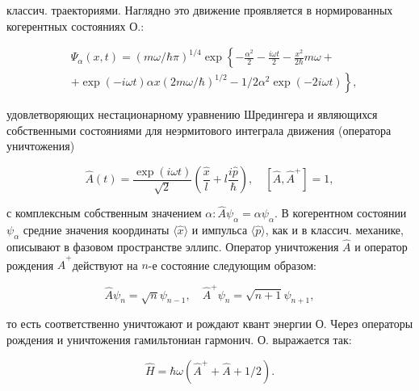 \documentclass[10pt]{article}
\begin{document}
классич. траекториями. Наглядно это движение проявляется в нормированных когерентных состояниях О.:



\[

\begin{aligned}

& \Psi_{\alpha}(x, t)=(m \omega / \hbar \pi)^{1 / 4} \exp \left\{-\frac{\alpha^{2}}{2}-\frac{i \omega t}{2}-\frac{x^{2}}{2 \hbar} m \omega+\right. \\

& \left.+\exp (-i \omega t) \alpha x(2 m \omega / \hbar)^{1 / 2}-1 / 2 \alpha^{2} \exp (-2 i \omega t)\right\},

\end{aligned}

\]



удовлетворяющих нестационарному уравнению Шредингера и являющихся собственными состояниями для неэрмитового интеграла движения (оператора уничтожения)



\[

\hat{A}(t)=\frac{\exp (i \omega t)}{\sqrt{2}}\left(\frac{\hat{x}}{l}+l \frac{i \hat{p}}{\hbar}\right), \quad\left[\hat{A}, \hat{A}^{+}\right]=1,

\]



с комплексным собственным значением $\alpha: \hat{A} \psi_{\alpha}=\alpha \psi_{\alpha}$. В когерентном состоянии $\psi_{\alpha}$ средние значения координаты $\langle\hat{x}\rangle$ и импульса $\langle\hat{p}\rangle$, как и в классич. механике, описывают в фазовом пространстве эллипс. Оператор уничтожения $\hat{A}$ и оператор рождения $\hat{A}^{+}$действуют на $n$-е состояние следующим образом:



\[

\hat{A} \psi_{n}=\sqrt{n} \psi_{n-1}, \quad \hat{A}^{+} \psi_{n}=\sqrt{n+1} \psi_{n+1},

\]



то есть соответственно уничтожают и рождают квант энергии О. Через операторы рождения и уничтожения гамильтониан гармонич. О. выражается так:



\[

\hat{H}=\hbar \omega\left(\hat{A}^{+}+\hat{A}+1 / 2\right) .

\]
\end{document}
